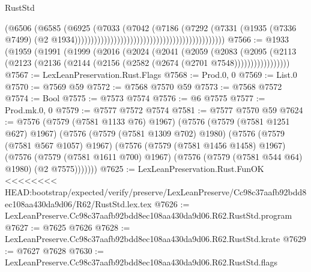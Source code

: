 \begin{lexlean}{RustStd}
\begin{coremodule}
{\begin{coremodule}
{{{{{{{{{{{{{{{{{{{{{{{{{{{{{{{{{{{{{{{{{{{{{{{{{{{{{                                                                            (@6506
                                                                              (@6585
                                                                                (@6925
                                                                                  (@7033
                                                                                    (@7042
                                                                                      (@7186
                                                                                        (@7292
                                                                                          (@7331
                                                                                            (@1935
                                                                                              (@7336
                                                                                                @7499)
                                                                                              (@2
                                                                                                @1934))))))))))))))))))))))))))))))))))))))))))))))
@7566 := @1933
    (@1959
      (@1991
        (@1999
          (@2016
            (@2024
              (@2041
                (@2059
                  (@2083
                    (@2095
                      (@2113 (@2123 (@2136 (@2144 (@2156 (@2582 (@2674 (@2701 @7548)))))))))))))))))
@7567 := LexLeanPreservation.Rust.Flags
@7568 := Prod.{0, 0}
@7569 := List.{0}
@7570 := @7569 @59
@7572 := @7568 @7570 @59
@7573 := @7568 @7572
@7574 := Bool
@7575 := @7573 @7574
@7576 := @6 @7575
@7577 := Prod.mk.{0, 0}
@7579 := @7577 @7572 @7574
@7581 := @7577 @7570 @59
@7624 := @7576
    (@7579 (@7581 @1133 @76) @1967)
    (@7576
      (@7579 (@7581 @1251 @627) @1967)
      (@7576
        (@7579 (@7581 @1309 @702) @1980)
        (@7576
          (@7579 (@7581 @567 @1057) @1967)
          (@7576
            (@7579 (@7581 @1456 @1458) @1967)
            (@7576
              (@7579 (@7581 @1611 @700) @1967)
              (@7576 (@7579 (@7581 @544 @64) @1980) (@2 @7575)))))))
@7625 := LexLeanPreservation.Rust.FunOK
<<<<<<<< HEAD:bootstrap/expected/verify/preserve/LexLeanPreserve/Cc98c37aafb92bdd8ec108aa430da9d06/R62/RustStd.lex.tex
@7626 := LexLeanPreserve.Cc98c37aafb92bdd8ec108aa430da9d06.R62.RustStd.program
@7627 := @7625 @7626
@7628 := LexLeanPreserve.Cc98c37aafb92bdd8ec108aa430da9d06.R62.RustStd.krate
@7629 := @7627 @7628
@7630 := LexLeanPreserve.Cc98c37aafb92bdd8ec108aa430da9d06.R62.RustStd.flags
}}}}}}}}}}}}}}}}}}}}}}}}}}}}}}}}}}}}}}}}}}}}}}}}}}}}}
\end{coremodule}}
\end{coremodule}
\end{lexlean}
